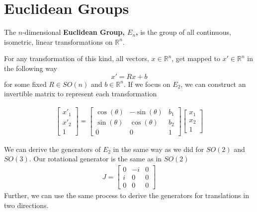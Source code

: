 \documentclass[compress,aspectratio=169,10pt,usenames,dvipsnames]{beamer}
\newcommand{\R}{\mathbb{R}}
\begin{document}
\section{Euclidean Groups}
\begin{frame}
\sectionpage
\end{frame}
%
%
\begin{frame}
\vfill
\begin{definition}
	The $n$-dimensional \textbf{Euclidean Group, $E_n$,} is the group of all continuous, isometric, linear transformations on $\R^n$.
\end{definition}
\vfill
For any transformation of this kind, all vectors, $x\in\R^n$, get mapped to $x'\in\R^n$ in the following way 
$$x' = Rx + b$$
for some fixed $R\in SO(n)$ and $b\in\R^n$.
\vfill
If we focus on $E_2$, we can construct an invertible matrix to represent each transformation

\begin{equation}
\begin{aligned}\begin{bmatrix}x'_1\\x'_2 \\ 1\end{bmatrix} = \begin{bmatrix}
			\cos(\theta) & -\sin(\theta) & b_1\\
			\sin(\theta) & \cos(\theta) & b_2 \\
			0&0&1
		\end{bmatrix} \begin{bmatrix}x_1\\x_2\\1\end{bmatrix}\end{aligned}
\end{equation}

\end{frame}

\begin{frame}
\vfill
We can derive the generators of $E_2$ in the same way as we did for $SO(2)$ and $SO(3)$.
\vfill
Our rotational generator is the same as in $SO(2)$
\begin{equation}
\begin{aligned}
J=\begin{bmatrix}
			0 & -i & 0\\
			i & 0 & 0 \\
			0 & 0 & 0
		\end{bmatrix}
\end{aligned}
\end{equation}
\vfill
Further, we can use the same process to derive the generators for translations in two directions.\vfill
\end{frame}
\end{document}
